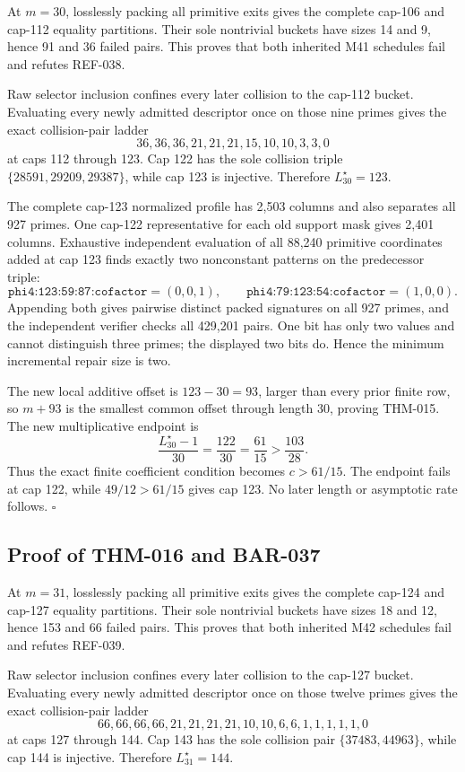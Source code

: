 \documentclass[11pt]{article}
\begin{document}
At \(m=30\), losslessly packing all primitive exits gives the complete
cap-106 and cap-112 equality partitions. Their sole nontrivial buckets have
sizes 14 and 9, hence 91 and 36 failed pairs. This proves that both inherited
M41 schedules fail and refutes REF-038.

Raw selector inclusion confines every later collision to the cap-112 bucket.
Evaluating every newly admitted descriptor once on those nine primes gives
the exact collision-pair ladder
\[
36,36,36,21,21,21,15,10,10,3,3,0
\]
at caps 112 through 123. Cap 122 has the sole collision triple
\(\{28591,29209,29387\}\), while cap 123 is injective. Therefore
\(L_{30}^{\star}=123\).

The complete cap-123 normalized profile has 2,503 columns and also separates
all 927 primes. One cap-122 representative for each old support mask gives
2,401 columns. Exhaustive independent evaluation of all 88,240 primitive
coordinates added at cap 123 finds exactly two nonconstant patterns on the
predecessor triple:
\[
\texttt{phi4:123:59:87:cofactor}=(0,0,1),\qquad
\texttt{phi4:79:123:54:cofactor}=(1,0,0).
\]
Appending both gives pairwise distinct packed signatures on all 927 primes,
and the independent verifier checks all 429,201 pairs. One bit has only two
values and cannot distinguish three primes; the displayed two bits do.
Hence the minimum incremental repair size is two.

The new local additive offset is \(123-30=93\), larger than every prior
finite row, so \(m+93\) is the smallest common offset through length 30,
proving THM-015. The new multiplicative endpoint is
\[
\frac{L_{30}^{\star}-1}{30}=\frac{122}{30}=\frac{61}{15}
 > \frac{103}{28}.
\]
Thus the exact finite coefficient condition becomes \(c>61/15\). The
endpoint fails at cap 122, while \(49/12>61/15\) gives cap 123. No later
length or asymptotic rate follows. \(\square\)

\subsection{Proof of THM-016 and BAR-037}
\label{proof:THM-016-BAR-037}

At \(m=31\), losslessly packing all primitive exits gives the complete
cap-124 and cap-127 equality partitions. Their sole nontrivial buckets have
sizes 18 and 12, hence 153 and 66 failed pairs. This proves that both
inherited M42 schedules fail and refutes REF-039.

Raw selector inclusion confines every later collision to the cap-127 bucket.
Evaluating every newly admitted descriptor once on those twelve primes gives
the exact collision-pair ladder
\[
66,66,66,66,21,21,21,21,10,10,6,6,1,1,1,1,1,0
\]
at caps 127 through 144. Cap 143 has the sole collision pair
\(\{37483,44963\}\), while cap 144 is injective. Therefore
\(L_{31}^{\star}=144\).
\end{document}
